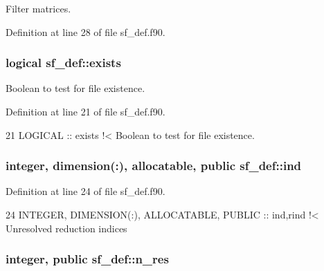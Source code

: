 Filter matrices. 



Definition at line 28 of file sf\+\_\+def.\+f90.

\subsubsection[{\texorpdfstring{exists}{exists}}]{\setlength{\rightskip}{0pt plus 5cm}logical sf\+\_\+def\+::exists\hspace{0.3cm}{\ttfamily [private]}}\hypertarget{namespacesf__def_a4461dcde80d3a5a5d53bb45e55839b5d}{}\label{namespacesf__def_a4461dcde80d3a5a5d53bb45e55839b5d}


Boolean to test for file existence. 



Definition at line 21 of file sf\+\_\+def.\+f90.


\begin{DoxyCode}
21   \textcolor{keywordtype}{LOGICAL} :: exists\textcolor{comment}{ !< Boolean to test for file existence.}
\end{DoxyCode}
\subsubsection[{\texorpdfstring{ind}{ind}}]{\setlength{\rightskip}{0pt plus 5cm}integer, dimension(\+:), allocatable, public sf\+\_\+def\+::ind}\hypertarget{namespacesf__def_a5e294b6f015b0b0499c9cee47da37627}{}\label{namespacesf__def_a5e294b6f015b0b0499c9cee47da37627}


Definition at line 24 of file sf\+\_\+def.\+f90.


\begin{DoxyCode}
24   \textcolor{keywordtype}{INTEGER}, \textcolor{keywordtype}{DIMENSION(:)}, \textcolor{keywordtype}{ALLOCATABLE}, \textcolor{keywordtype}{PUBLIC} :: ind,rind\textcolor{comment}{        !< Unresolved reduction indices }
\end{DoxyCode}
\subsubsection[{\texorpdfstring{n\+\_\+res}{n_res}}]{\setlength{\rightskip}{0pt plus 5cm}integer, public sf\+\_\+def\+::n\+\_\+res}\hypertarget{namespacesf__def_af05cacb04c0c2d10c9405e71db633a43}{}\label{namespacesf__def_af05cacb04c0c2d10c9405e71db633a43}


